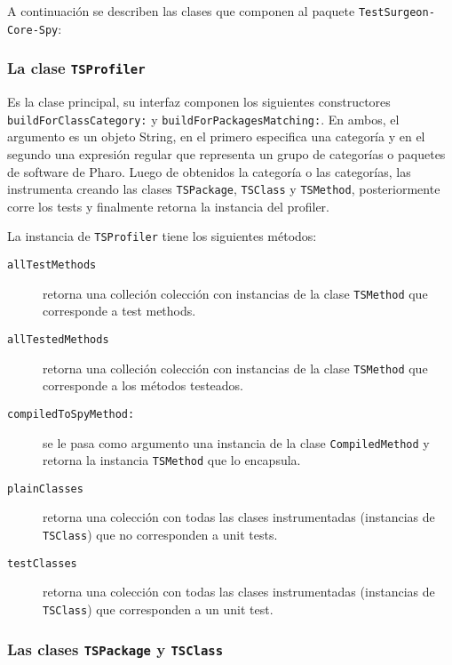 \par A continuación se describen las clases que componen al paquete {\tt TestSurgeon-Core-Spy}:

\subsubsection{La clase {\tt TSProfiler}}

\par Es la clase principal, su interfaz componen los siguientes constructores {\tt buildForClassCategory:} y {\tt buildForPackagesMatching:}. En ambos, el argumento es un objeto String, en el primero especifica una categoría y en el segundo una expresión regular que representa un grupo de categorías o paquetes de software de Pharo. Luego de obtenidos la categoría o las categorías, las instrumenta creando las clases {\tt TSPackage}, {\tt TSClass} y {\tt TSMethod}, posteriormente corre los tests y finalmente retorna la instancia del profiler.

\par La instancia de {\tt TSProfiler} tiene los siguientes métodos:

\begin{description}
\item[{\tt allTestMethods}] retorna una colleción colección con instancias de la clase {\tt TSMethod} que corresponde a test methods.
\item[{\tt allTestedMethods}] retorna una colleción colección con instancias de la clase {\tt TSMethod} que corresponde a los métodos testeados.
\item[{\tt compiledToSpyMethod:}] se le pasa como argumento una instancia de la clase {\tt CompiledMethod} y retorna la instancia {\tt TSMethod} que lo encapsula.
\item[{\tt plainClasses}] retorna una colección con todas las clases instrumentadas (instancias de {\tt TSClass}) que no corresponden a unit tests.
\item[{\tt testClasses}] retorna una colección con todas las clases instrumentadas (instancias de {\tt TSClass}) que corresponden a un unit test.
\end{description}

\subsubsection{Las clases {\tt TSPackage} y {\tt TSClass}}

